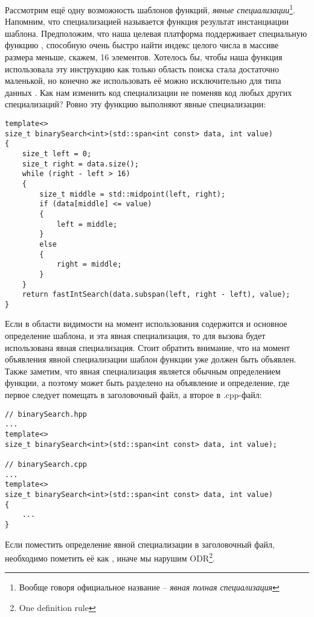 Рассмотрим ещё одну возможность шаблонов функций, \textit{явные специализации}\footnote{Вообще говоря официальное название -- \textit{явная полная специализация}}. Напомним, что специализацией называется функция результат инстанциации шаблона. Предположим, что наша целевая платформа поддерживает специальную функцию , способную очень быстро найти индекс целого числа в массиве размера меньше, скажем, 16 элементов. Хотелось бы, чтобы наша функция  использовала эту инструкцию как только область поиска стала достаточно маленькой, но конечно же использовать её можно исключительно для типа данных . Как нам изменить код специализации  не поменяв код любых других специализаций? Ровно эту функцию выполняют явные специализации:
\begin{verbatim}
template<>
size_t binarySearch<int>(std::span<int const> data, int value)
{
    size_t left = 0;
    size_t right = data.size();
    while (right - left > 16)
    {
        size_t middle = std::midpoint(left, right);
        if (data[middle] <= value)
        {
            left = middle;
        }
        else
        {
            right = middle;
        }
    }
    return fastIntSearch(data.subspan(left, right - left), value);
}
\end{verbatim}
Если в области видимости на момент использования  содержится и основное определение шаблона, и эта явная специализация, то для вызова будет использована явная специализация. Стоит обратить внимание, что на момент объявления явной специализации шаблон функции уже должен быть объявлен. Также заметим, что явная специализация является обычным определением функции, а поэтому может быть разделено на объявление и определение, где первое следует помещать в заголовочный файл, а второе в .cpp-файл:
\begin{verbatim}
// binarySearch.hpp
...
template<>
size_t binarySearch<int>(std::span<int const> data, int value);

// binarySearch.cpp
...
template<>
size_t binarySearch<int>(std::span<int const> data, int value)
{
    ...
}
\end{verbatim}
Если поместить определение явной специализации в заголовочный файл, необходимо пометить её как , иначе мы нарушим ODR\footnote{One definition rule}.

